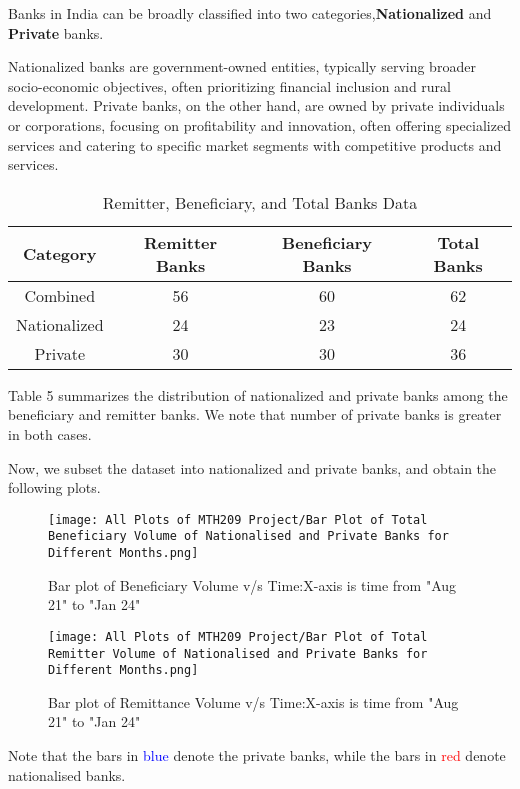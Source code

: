 \documentclass{article}
\begin{document}
Banks in India can be broadly classified into two categories,\textbf{Nationalized} and \textbf{Private} banks.

Nationalized banks are government-owned entities, typically serving broader socio-economic objectives, often prioritizing financial inclusion and rural development. Private banks, on the other hand, are owned by private individuals or corporations, focusing on profitability and innovation, often offering specialized services and catering to specific market segments with competitive products and services.

\begin{table}[h]
\centering
\begin{tabular}{|c|c|c|c|}
\hline
Category & Remitter Banks & Beneficiary Banks & Total Banks \\
\hline
Combined & 56 & 60 & 62 \\
Nationalized & 24 & 23 & 24 \\
Private & 30 & 30 & 36 \\
\hline
\end{tabular}
\caption{Remitter, Beneficiary, and Total Banks Data}
\label{tab:bank_data}
\end{table}

Table 5 summarizes the distribution of nationalized and private banks among the beneficiary and remitter banks. We note that number of private banks is greater in both cases.

Now, we subset the dataset into nationalized and private banks, and obtain the following plots.

\begin{figure}[H]
    \centering
    \texttt{[image: All Plots of MTH209 Project/Bar Plot of Total Beneficiary Volume of Nationalised and Private Banks for Different Months.png]}
    \caption{Bar plot of Beneficiary Volume v/s Time:X-axis is time from "Aug 21" to "Jan 24"}
    \label{fig:example}
\end{figure}

\begin{figure}[H]
    \centering
    \texttt{[image: All Plots of MTH209 Project/Bar Plot of Total Remitter Volume of Nationalised and Private Banks for Different Months.png]}
    \caption{Bar plot of Remittance Volume v/s Time:X-axis is time from "Aug 21" to "Jan 24"}
    \label{fig:example}
\end{figure}

Note that the bars in \textcolor{blue}{blue} denote the private banks, while the bars in \textcolor{red}{red} denote nationalised banks.
\end{document}
